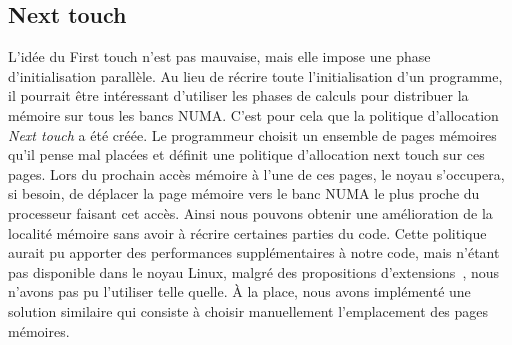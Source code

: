 \subsection{Next touch}
\label{sec:next_touch}
L'idée du First touch n'est pas mauvaise, mais elle impose une phase d'initialisation parallèle.
%
Au lieu de récrire toute l'initialisation d'un programme, il pourrait être intéressant d'utiliser les phases de calculs pour distribuer la mémoire sur tous les bancs NUMA.
%
C'est pour cela que la politique d'allocation {\em Next touch} a été créée.
%
Le programmeur choisit un ensemble de pages mémoires qu'il pense mal placées et définit une politique d'allocation next touch sur ces pages.
%
Lors du prochain accès mémoire à l'une de ces pages, le noyau s'occupera, si besoin, de déplacer la page mémoire vers le banc NUMA le plus proche du processeur faisant cet accès.
%
Ainsi nous pouvons obtenir une amélioration de la localité mémoire sans avoir à récrire certaines parties du code.
%
Cette politique aurait pu apporter des performances supplémentaires à notre code, mais n'étant pas disponible dans le noyau Linux, malgré des propositions d'extensions~\cite{next_touch_linux,GoFu09Next-touch}, nous n'avons pas pu l'utiliser telle quelle.
%
\`A la place, nous avons implémenté une solution similaire qui consiste à choisir manuellement l'emplacement des pages mémoires.
